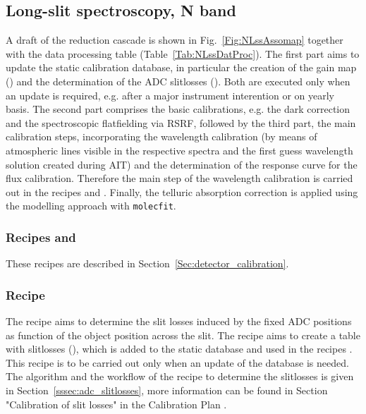 \clearpage
\subsection{Long-slit spectroscopy, N band}
\label{ssec:recipes_lss_n}
A draft of the reduction cascade is shown in
Fig.~\ref{Fig:NLssAssomap} together with the data processing table
(Table~\ref{Tab:NLssDatProc}). The first part aims to update the static calibration database, in particular the creation of the gain map (\hyperref[Sec:detector_calibration]{}) and the determination of the \ac{ADC} slitlosses (\hyperref[rec:metisnadcmslitloss]{}). Both are executed only when an update is required, e.g. after a major instrument interention or on yearly basis. The second part comprises the basic
calibrations, e.g. the 
dark correction and the spectroscopic flatfielding via \ac{RSRF}, followed by the third part, the main calibration steps, incorporating the wavelength calibration (by means of atmospheric lines visible in the respective spectra and the first guess wavelength solution created during \ac{AIT}) and the determination of the response curve for the flux calibration. Therefore the main step of the wavelength calibration is carried out in the recipes \hyperref[rec:lssnflux]{} and \hyperref[rec:lssnsci]{}. Finally, the telluric absorption correction is applied using the modelling approach with \texttt{molecfit}.
\subsubsection{Recipes  and }
These recipes are described in Section~\ref{Sec:detector_calibration}.
\subsubsection{Recipe }
The recipe \hyperref[sssec:adc_slitlosses]{} aims to determine the slit losses induced by the fixed \ac{ADC} positions as function of the object position across the slit. The recipe aims to create a table with slitlosses (\hyperref[dataitem:nadcslitloss]{}), which is added to the static database and used in the recipes \hyperref[rec:lssnflux]{}. This recipe is to be carried out only when an update of the database is needed. The algorithm and the workflow of the recipe to determine the slitlosses is given in Section~\ref{sssec:adc_slitlosses}, more information can be found in Section "Calibration of slit losses" in the Calibration Plan \cite{METIS-calibration_plan}. 

